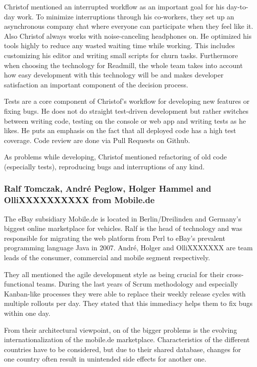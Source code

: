 Christof mentioned an interrupted workflow as an important goal for his day-to-day work. To minimize interruptions through his co-workers, they set up an asynchronous company chat where everyone can participate when they feel like it. Also Christof always works with noise-canceling headphones on. He optimized his tools highly to reduce any wasted waiting time while working. This includes customizing his editor and writing small scripts for churn tasks. Furthermore when choosing the technology for Readmill, the whole team takes into account how easy development with this technology will be and makes developer satisfaction an important component of the decision process.

Tests are a core component of Christof's workflow for developing new features or fixing bugs. He does not do straight test-driven development but rather switches between writing code, testing on the console or web app and writing tests as he likes. He puts an emphasis on the fact that all deployed code has a high test coverage. Code review are done via Pull Requests on Github.

As problems while developing, Christof mentioned refactoring of old code (especially tests), reproducing bugs and interruptions of any kind.

\subsubsection{Ralf Tomczak, Andr\'e Peglow, Holger Hammel and OlliXXXXXXXXXX from Mobile.de}
The eBay subsidiary Mobile.de is located in Berlin/Dreilinden and Germany's biggest online marketplace for vehicles. 
Ralf is the head of technology and was responsible for migrating the web platform from Perl to eBay's prevalent programming language Java in 2007. 
Andr\'e, Holger and OlliXXXXXXX are team leads of the consumer, commercial and mobile segment respectively. 

They all mentioned the agile development style as being crucial for their cross-functional teams.
During the last years of Scrum methodology and especially Kanban-like processes they were able to replace their weekly release cycles with multiple rollouts per day. 
They stated that this immediacy helps them to fix bugs within one day.

From their architectural viewpoint, on of the bigger problems is the evolving internationalization of the mobile.de marketplace. Characteristics of the different countries have to be considered, but due to their shared database, changes for one country often result in unintended side effects for another one.

